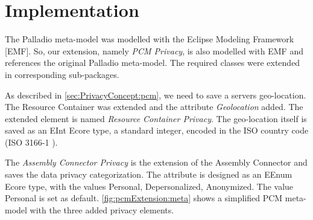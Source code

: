 \section{Implementation}
\label{sec:pcmExtension:impl}

The Palladio meta-model was modelled with the Eclipse Modeling Framework [EMF]. So, our extension, namely \textit{PCM Privacy}, is also modelled with EMF and references the original Palladio meta-model. The required classes were extended in corresponding sub-packages.

As described in \autoref{sec:PrivacyConcept:pcm}, we need to save a servers geo-location. The Resource Container was extended and the attribute \textit{Geolocation} added. The extended element is named \textit{Resource Container Privacy}. The geo-location itself is saved as an EInt Ecore type, a standard integer, encoded in the ISO country code (ISO 3166-1 \cite{Wikipedia.ISO_3166}).

The \textit{Assembly Connector Privacy} is the extension of the Assembly Connector and saves the data privacy categorization. The attribute is designed as an EEnum Ecore type, with the values Personal, Depersonalized, Anonymized. The value Personal is set as default. \autoref{fig:pcmExtension:meta} shows a simplified PCM meta-model with the three added privacy elements.




